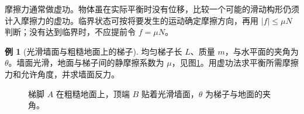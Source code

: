 \documentclass[11pt,openany,fontset=fandol]{ctexbook}
\theoremstyle{definition}\newtheorem{example}{例}[chapter]\newtheorem{exercise}{习题}[chapter]
\begin{document}
摩擦力通常做虚功。物体虽在实际平衡时没有位移，比较一个可能的滑动构形仍须计入摩擦力的虚功。临界状态可按将要发生的运动确定摩擦方向，再用 $|f|\le\mu N$ 判断；没有达到临界时，不应提前令 $f=\mu N$。

\par\medskip\noindent\begin{minipage}{\textwidth}
\begin{example}[光滑墙面与粗糙地面上的梯子]\label{mp5:example:l5-e4}
均匀梯子长 $L$、质量 $m$，与水平面的夹角为 $\theta$。墙面光滑，地面与梯子间的静摩擦系数为 $\mu$，见图\ref{mp5:fig:l5-e4-q}。用虚功法求平衡所需摩擦力和允许角度，并求墙面反力。
\end{example}

\begin{figure}[H]\centering
{}
\caption{梯脚 $A$ 在粗糙地面上，顶端 $B$ 贴着光滑墙面，$\theta$ 为梯子与地面的夹角。}\label{mp5:fig:l5-e4-q}
\end{figure}
\end{minipage}\par\medskip
\end{document}
